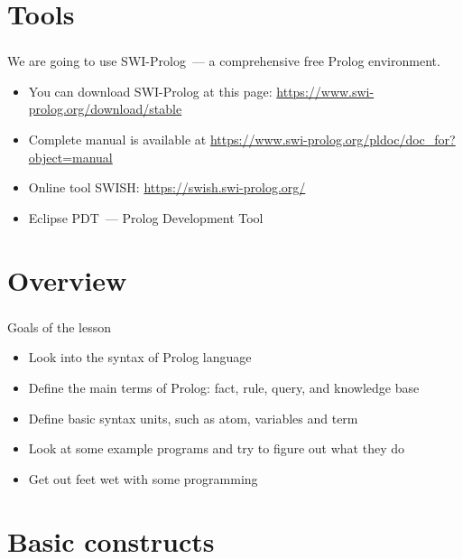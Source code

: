 \frame[plain]{\titlepage}


\section{Tools}

\begin{frame}
	\frametitle{\insertsection}
	We are going to use SWI-Prolog~--- a comprehensive free Prolog environment.
	\begin{itemize}
		\item You can download SWI-Prolog at this page: \href{https://www.swi-prolog.org/download/stable}{https://www.swi-prolog.org/download/stable}
		\item Complete manual is available at \href{https://www.swi-prolog.org/pldoc/doc_for?object=manual}{https://www.swi-prolog.org/pldoc/doc\_for?object=manual}
		\item Online tool SWISH: \href{https://swish.swi-prolog.org/}{https://swish.swi-prolog.org/}
		\item Eclipse PDT~--- Prolog Development Tool
	\end{itemize}
\end{frame}

\section{Overview}

\begin{frame}
	\frametitle{\insertsection}
	Goals of the lesson
	\begin{itemize}
		\item Look into the syntax of Prolog language
		\item Define the main terms of Prolog: fact, rule, query, and knowledge base
		\item Define basic syntax units, such as atom, variables and term
		\item Look at some example programs and try to figure out what they do
		\item Get out feet wet with some programming
	\end{itemize}
\end{frame}

\section{Basic constructs}

